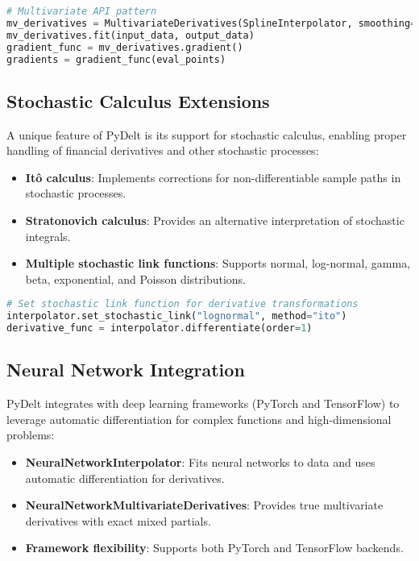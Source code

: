 \documentclass[11pt,a4paper]{article}
\begin{document}
\begin{lstlisting}[language=Python, caption=Multivariate calculus example]
# Multivariate API pattern
mv_derivatives = MultivariateDerivatives(SplineInterpolator, smoothing=0.1)
mv_derivatives.fit(input_data, output_data)
gradient_func = mv_derivatives.gradient()
gradients = gradient_func(eval_points)
\end{lstlisting}

\subsection{Stochastic Calculus Extensions}

A unique feature of PyDelt is its support for stochastic calculus, enabling proper handling of financial derivatives and other stochastic processes:

\begin{itemize}
    \item \textbf{Itô calculus}: Implements corrections for non-differentiable sample paths in stochastic processes.
    \item \textbf{Stratonovich calculus}: Provides an alternative interpretation of stochastic integrals.
    \item \textbf{Multiple stochastic link functions}: Supports normal, log-normal, gamma, beta, exponential, and Poisson distributions.
\end{itemize}

\begin{lstlisting}[language=Python, caption=Stochastic calculus example]
# Set stochastic link function for derivative transformations
interpolator.set_stochastic_link("lognormal", method="ito")
derivative_func = interpolator.differentiate(order=1)
\end{lstlisting}

\subsection{Neural Network Integration}

PyDelt integrates with deep learning frameworks (PyTorch and TensorFlow) to leverage automatic differentiation for complex functions and high-dimensional problems:

\begin{itemize}
    \item \textbf{NeuralNetworkInterpolator}: Fits neural networks to data and uses automatic differentiation for derivatives.
    \item \textbf{NeuralNetworkMultivariateDerivatives}: Provides true multivariate derivatives with exact mixed partials.
    \item \textbf{Framework flexibility}: Supports both PyTorch and TensorFlow backends.
\end{itemize}
\end{document}
